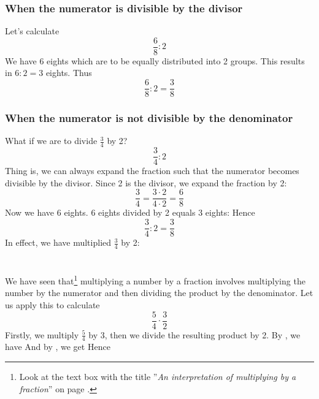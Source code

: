 \subsubsection{When the numerator is divisible by the divisor}
Let's calculate
\[ \frac{6}{8}:2 \]
We have 6 eights which are to be equally distributed into 2 groups. This results in $ 6:2=3 $ eights.
Thus
\[ \frac{6}{8}:2=\frac{3}{8} \]
\newpage
\subsubsection{When the numerator is not divisible by the denominator}
What if we are to divide $ \frac{3}{4} $ by 2? 
\[ \frac{3}{4}:2 \]
Thing is, we can always expand the fraction such that the numerator becomes divisible by the divisor. Since 2 is the divisor, we expand the fraction by 2:
\[ \frac{3}{4}=\frac{3\cdot2}{4\cdot2}=\frac{6}{8} \]
Now we have 6 eights. 6 eights divided by 2 equals 3 eights:
Hence
\[ \frac{3}{4}:2=\frac{3}{8} \]
In effect, we have multiplied $ \frac{3}{4} $ by 2:
\section{\brgngbr \label{brgngbr}}		
We have seen that\footnote{Look at the text box with the title ''\textit{An interpretation of multiplying by a fraction}'' on page \pageref{brtolk}.} multiplying a number by a fraction involves multiplying the number by the numerator and then dividing the product by the denominator. Let us apply this to calculate
\[  {\frac{5}{4}\cdot\frac{3}{2}}\] 
Firstly, we multiply $ \frac{5}{4} $ by 3, then we divide the resulting product by 2. By , we have
And by , we get
Hence
\reg[\brtbr\label{brtbr}]{
When multiplying a fraction by a fraction, we multiply numerator by numerator and denominator by denominator.
}
\newpage
